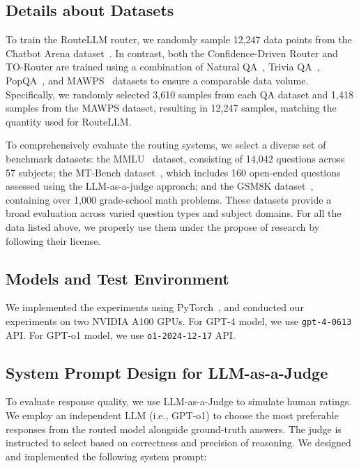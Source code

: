 \subsection{Details about Datasets}
To train the RouteLLM router, we randomly sample 12,247 data points from the Chatbot Arena dataset~\cite{chiang2024chatbot}. In contrast, both the Confidence-Driven Router and TO-Router are trained using a combination of Natural QA~\cite{Kwiatkowski, lee-etal-2019-latent}, Trivia QA~\cite{2017arXivtriviaqa}, PopQA~\cite{mallen2023llm_memorization}, and MAWPS~\cite{KoncelKedziorski2016MAWPSAM} datasets to ensure a comparable data volume. Specifically, we randomly selected 3,610 samples from each QA dataset and 1,418 samples from the MAWPS dataset, resulting in 12,247 samples, matching the quantity used for RouteLLM.

To comprehensively evaluate the routing systems, we select a diverse set of benchmark datasets: the MMLU~\cite{Hendrycks2020MeasuringMM} dataset, consisting of 14,042 questions across 57 subjects; the MT-Bench dataset~\cite{Zheng2023JudgingLW}, which includes 160 open-ended questions assessed using the LLM-as-a-judge approach; and the GSM8K dataset~\cite{Cobbe2021TrainingVT}, containing over 1,000 grade-school math problems. These datasets provide a broad evaluation across varied question types and subject domains. For all the data listed above, we properly use them under the propose of research by following their license. 

\subsection{Models and Test Environment}
We implemented the experiments using PyTorch~\cite{pytorch}, and conducted our experiments on two NVIDIA A100 GPUs. For GPT-4 model, we use \texttt{gpt-4-0613} API. For GPT-o1 model, we use \texttt{o1-2024-12-17} API.

\subsection{System Prompt Design for LLM-as-a-Judge}
To evaluate response quality, we use LLM-as-a-Judge to simulate human ratings. We employ an independent LLM (i.e., GPT-o1) to choose the most preferable responses from the routed model alongside ground-truth answers. The judge is instructed to select based on correctness and precision of reasoning. We designed and implemented the following system prompt:


